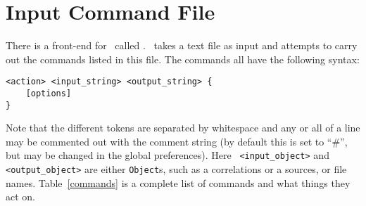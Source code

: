 \section{Input Command File}

There is a front-end for \coral\, called \reefer.  \reefer\, takes a text file as 
input and attempts to carry out the commands listed in this file.  The commands
all have the following syntax:
\begin{verbatim}
<action> <input_string> <output_string> {
    [options]
}
\end{verbatim}
Note that the different tokens are separated by whitespace and any or all of a
line may be commented out with the comment string (by default this is set to
``\#'', but may be changed in the global preferences).  Here {\tt 
<input\_object>} and {\tt <output\_object>} are 
either {\tt Object}s, such as a correlations or a sources, or file names.  
Table~\ref{commands} is a complete list of commands and what things they act 
on.

